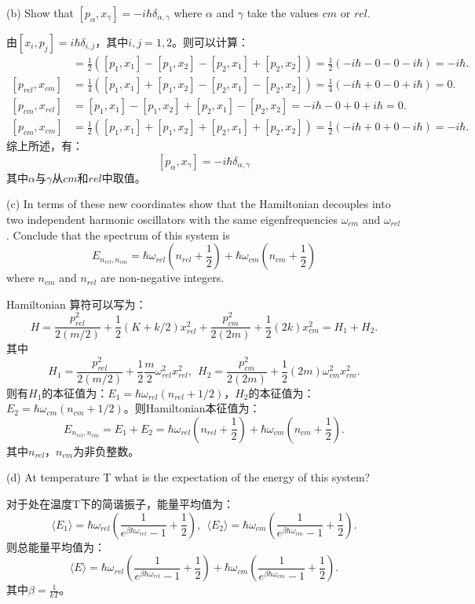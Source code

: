 \documentclass[reqno,a4paper,12pt]{amsart}
\begin{document}
(b) Show that $[p_\alpha, x_\gamma] = -i\hbar\delta_{\alpha,\gamma}$ where $\alpha$ and $\gamma$ take the values $cm$ or $rel$.
\begin{tcolorbox}[breakable, colback = black!5!white, colframe = black]
由$[x_i, p_j] = i\hbar\delta_{i,j}$，其中$i,j = 1,2$。则可以计算：
\begin{align*}
	[p_{rel}, x_{rel}] &= \frac{1}{2}([p_1,x_1] - [p_1,x_2] - [p_2,x_1] + [p_2,x_2]) = \frac{1}{2}(-i\hbar-0-0-i\hbar) = -i\hbar. \\
	[p_{rel}, x_{cm}] &= \frac{1}{4}([p_1,x_1] + [p_1,x_2] - [p_2,x_1] - [p_2,x_2]) = \frac{1}{4}(-i\hbar + 0 - 0 + i\hbar) = 0. \\
	[p_{cm}, x_{rel}] &= [p_1,x_1] - [p_1,x_2] + [p_2,x_1] - [p_2,x_2] = -i\hbar - 0 + 0 + i\hbar = 0. \\
	[p_{cm}, x_{cm}] &= \frac{1}{2}([p_1,x_1] + [p_1,x_2] + [p_2,x_1] + [p_2,x_2]) = \frac{1}{2}(-i\hbar+0+0-i\hbar) = -i\hbar.
\end{align*}
综上所述，有：
\[
	[p_\alpha, x_\gamma] = -i\hbar\delta_{\alpha,\gamma}
\]
其中$\alpha$与$\gamma$从$cm$和$rel$中取值。
\end{tcolorbox}

(c) In terms of these new coordinates show that the Hamiltonian decouples into two independent harmonic oscillators with the same eigenfrequencies $\omega_{cm}$ and $\omega_{rel}$. Conclude that the spectrum of this system is 
\[
	E_{n_{rel}, n_{cm}} = \hbar\omega_{rel} (n_{rel} + \frac{1}{2}) + \hbar\omega_{cm}(n_{cm} + \frac{1}{2})
\]
where $n_{cm}$ and $n_{rel}$ are non-negative integers.
\begin{tcolorbox}[breakable, colback = black!5!white, colframe = black]
Hamiltonian 算符可以写为：
\[
	H = \frac{p_{rel}^2}{2(m/2)} + \frac{1}{2}(K+k/2)x_{rel}^2 + \frac{p_{cm}^2}{2(2m)} + \frac{1}{2}(2k) x_{cm}^2 = H_1 + H_2.
\]
其中
\[
	H_1 = \frac{p_{rel}^2}{2(m/2)} + \frac{1}{2}\frac{m}{2}\omega_{rel}^2x_{rel}^2, ~~ H_2 = \frac{p_{cm}^2}{2(2m)} + \frac{1}{2}(2m)\omega_{cm}^2x_{cm}^2.
\]
则有$H_1$的本征值为：$E_1 = \hbar\omega_{rel}(n_{rel}+1/2)$，$H_2$的本征值为：$E_2 = \hbar\omega_{cm}(n_{cm}+1/2)$。则Hamiltonian本征值为：
\[
	E_{n_{rel}, n_{cm}} =E_1 + E_2 = \hbar\omega_{rel} (n_{rel} + \frac{1}{2}) + \hbar\omega_{cm}(n_{cm} + \frac{1}{2}).
\]
其中$n_{rel}$，$n_{cm}$为非负整数。
\end{tcolorbox}

(d) At temperature T what is the expectation of the energy of this system?
\begin{tcolorbox}[breakable, colback = black!5!white, colframe = black]
对于处在温度T下的简谐振子，能量平均值为：
\[
	\langle E_1 \rangle = \hbar\omega_{rel} \left( \frac{1}{e^{\beta\hbar\omega_{rel}} - 1} + \frac{1}{2} \right), ~~ \langle E_2 \rangle = \hbar\omega_{cm} \left( \frac{1}{e^{\beta\hbar\omega_{cm}} - 1} + \frac{1}{2} \right).
\]
则总能量平均值为：
\[
	\langle E \rangle = \hbar\omega_{rel} \left( \frac{1}{e^{\beta\hbar\omega_{rel}} - 1} + \frac{1}{2} \right) + \hbar\omega_{cm} \left( \frac{1}{e^{\beta\hbar\omega_{cm}} - 1} + \frac{1}{2} \right).
\]
其中$\beta = \frac{1}{kT}$。
\end{tcolorbox}
\end{document}
